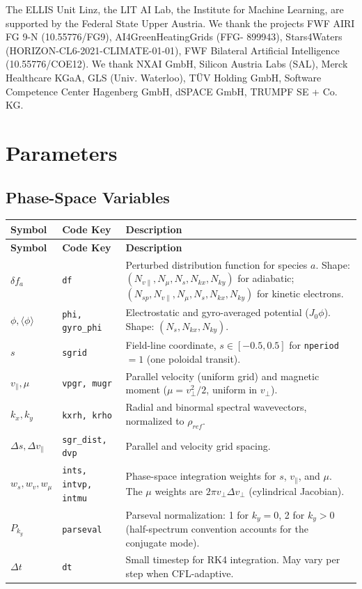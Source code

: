 \documentclass{article}
\theoremstyle{plain}
\theoremstyle{definition}
\theoremstyle{remark}
\begin{document}
The ELLIS Unit Linz, the LIT AI Lab, the Institute for Machine Learning, are supported by the Federal State Upper Austria. We thank the projects FWF AIRI FG 9-N (10.55776/FG9), AI4GreenHeatingGrids (FFG- 899943), Stars4Waters (HORIZON-CL6-2021-CLIMATE-01-01), FWF Bilateral Artificial Intelligence (10.55776/COE12). We thank NXAI GmbH, Silicon Austria Labs (SAL), Merck Healthcare KGaA, GLS (Univ. Waterloo), T\"{U}V Holding GmbH, Software Competence Center Hagenberg GmbH, dSPACE GmbH, TRUMPF SE + Co. KG.




\newpage
\appendix
{}
\onecolumn
\section{Parameters}

\subsection{Phase-Space Variables}
\renewcommand{\arraystretch}{1.4}
\begin{longtable}{p{} p{} p{}}
\toprule
\textbf{Symbol} & \textbf{Code Key} & \textbf{Description} \\
\midrule
\endfirsthead
\toprule
\textbf{Symbol} & \textbf{Code Key} & \textbf{Description} \\
\midrule
\endhead
\bottomrule
\endfoot
$\delta f_a$ & \texttt{df} & Perturbed distribution function for species $a$. Shape: $(N_{v\parallel}, N_\mu, N_s, N_{kx}, N_{ky})$ for adiabatic; $(N_{sp}, N_{v\parallel}, N_\mu, N_s, N_{kx}, N_{ky})$ for kinetic electrons. \\
$\phi, \langle\phi\rangle$ & \texttt{phi, gyro\_phi} & Electrostatic and gyro-averaged potential ($J_0 \phi$). Shape: $(N_s, N_{kx}, N_{ky})$. \\
$s$ & \texttt{sgrid} & Field-line coordinate, $s \in [-0.5, 0.5]$ for \texttt{nperiod}$=1$ (one poloidal transit). \\
$v_\parallel, \mu$ & \texttt{vpgr, mugr} & Parallel velocity (uniform grid) and magnetic moment ($\mu = v_\perp^2/2$, uniform in $v_\perp$). \\
$k_x, k_y$ & \texttt{kxrh, krho} & Radial and binormal spectral wavevectors, normalized to $\rho_{ref}$. \\
$\Delta s, \Delta v_\parallel$ & \texttt{sgr\_dist, dvp} & Parallel and velocity grid spacing. \\
$w_s, w_v, w_\mu$ & \texttt{ints, intvp, intmu} & Phase-space integration weights for $s$, $v_\parallel$, and $\mu$. The $\mu$ weights are $2\pi v_\perp \Delta v_\perp$ (cylindrical Jacobian). \\
$P_{k_y}$ & \texttt{parseval} & Parseval normalization: 1 for $k_y=0$, 2 for $k_y > 0$ (half-spectrum convention accounts for the conjugate mode). \\
$\Delta t$ & \texttt{dt} & Small timestep for RK4 integration. May vary per step when CFL-adaptive. \\
\bottomrule
\end{longtable}
\end{document}
